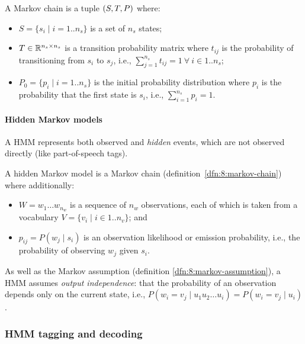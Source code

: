 \begin{dfn}
  \label{dfn:8:markov-chain}
  A Markov chain is a tuple $(S, T, P)$ where:
  \begin{itemize}
    \item $S = \{ s_i \mid i = 1 .. n_s \}$ is a set of $n_s$ states;
    \item $T \in \mathbb{R}^{n_s \times n_s}$ is a transition probability
          matrix where $t_{ij}$ is the probability of transitioning from $s_i$
          to $s_j$, i.e.,
          $\sum_{j = 1}^{n_s} t_{ij} = 1 \ \forall\ i \in 1 .. n_s$;
    \item $P_0 = \{ p_i \mid i = 1 .. n_s \}$ is the initial probability
          distribution where $p_i$ is the probability that the first state is
          $s_i$, i.e.,
          $\sum_{i = 1}^{n_s} p_i = 1$.
  \end{itemize}
\end{dfn}

\paragraph{Hidden Markov models}

A HMM represents both observed and \textit{hidden} events, which are not
observed directly (like part-of-speech tags).

\begin{dfn}
  \label{dfn:8:hidden-markov-model}
  A hidden Markov model is a Markov chain (definition~\ref{dfn:8:markov-chain})
  where additionally:
  \begin{itemize}
    \item $W = w_1 \dots w_{n_w}$ is a sequence of $n_w$ observations, each of
          which is taken from a vocabulary $V = \{ v_i \mid i \in 1 .. n_v \}$;
          and
    \item $p_{ij} = P(w_j \mid s_i)$ is an observation likelihood or emission
          probability, i.e., the probability of observing $w_j$ given $s_i$.
  \end{itemize}
\end{dfn}

As well as the Markov assumption (definition \ref{dfn:8:markov-assumption}), a
HMM assumes \textit{output independence}: that the probability of an
observation depends only on the current state, i.e., $P(w_i = v_j \mid u_1 u_2
  \dots u_i) = P(w_i = v_j \mid u_i)$.

\subsubsection{HMM tagging and decoding}

